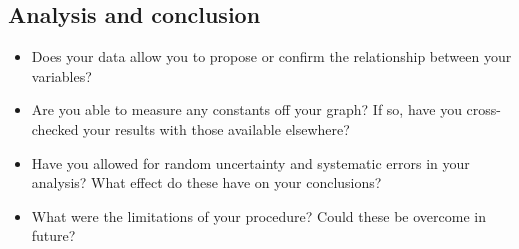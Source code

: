 \documentclass[a4paper]{article}
\begin{document}
\subsection*{Analysis and conclusion}
\begin{itemize}
    \item Does your data allow you to propose or confirm the relationship between your variables?
    \item Are you able to measure any constants off your graph?  If so, have you cross-checked your results with those available elsewhere?
    \item Have you allowed for random uncertainty and systematic errors in your analysis?  What effect do these have on your conclusions?
    \item What were the limitations of your procedure?  Could these be overcome in future?
\end{itemize}
\end{document}
